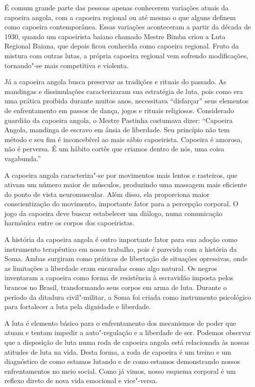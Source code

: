 É comum grande parte das pessoas apenas conhecerem variações atuais da
capoeira angola, com a capoeira regional ou até mesmo o que alguns
definem como capoeira contemporânea. Essas variações aconteceram a
partir da década de 1930, quando um capoeirista baiano chamado Mestre
Bimba criou a Luta Regional Baiana, que depois ficou conhecida como
capoeira regional. Fruto da mistura com outras lutas, a própria capoeira
regional vem sofrendo modificações, tornando"-se mais competitiva e
violenta.

Já a capoeira angola busca preservar as tradições e rituais do passado.
As mandingas e dissimulações caracterizaram sua estratégia de luta, pois
como era uma prática proibida durante muitos anos, necessitava
``disfarçar'' seus elementos de enfrentamento em passos de dança, jogos
e rituais religiosos. Considerado guardião da capoeira angola, o Mestre
Pastinha costumava dizer: ``Capoeira Angola, mandinga de escravo em
ânsia de liberdade. Seu princípio não tem método e seu fim é
inconcebível ao mais sábio capoeirista. Capoeira é amorosa, não é
perversa. É um hábito cortês que criamos dentro de nós, uma coisa
vagabunda.''

A capoeira angola caracteriza"-se por movimentos mais lentos e rasteiros,
que ativam um número maior de músculos, produzindo uma massagem mais
eficiente do ponto de vista neuromuscular. Além disso, ela proporciona
maior conscientização do movimento, importante fator para a percepção
corporal. O jogo da capoeira deve buscar estabelecer um diálogo, numa
comunicação harmônica entre os corpos dos capoeiristas.

A história da capoeira angola é outro importante fator para sua adoção
como instrumento terapêutico em nosso trabalho, pois é parecida com a
história da Soma. Ambas surgiram como práticas de libertação de
situações opressivas, onde as limitações a liberdade eram encaradas como
algo natural. Os negros inventaram a capoeira como forma de resistência
à escravidão imposta pelos brancos no Brasil, transformando seus corpos
em arma de luta. Durante o período da ditadura civil"-militar, a Soma foi
criada como instrumento psicológico para fortalecer a luta pela
dignidade e liberdade.

A luta é elemento básico para o enfrentamento dos mecanismos de poder
que atuam e tentam impedir a auto"-regulação e a liberdade de ser.
Podemos observar que a disposição de luta numa roda de capoeira angola
está relacionada às nossas atitudes de luta na vida. Desta forma, a roda
de capoeira é um treino e um diagnóstico de como estamos lutando e de
como estamos demonstrando nossos enfrentamentos no meio social. Como já
vimos, nosso esquema corporal é um reflexo direto de nova vida emocional
e vice"-versa.

